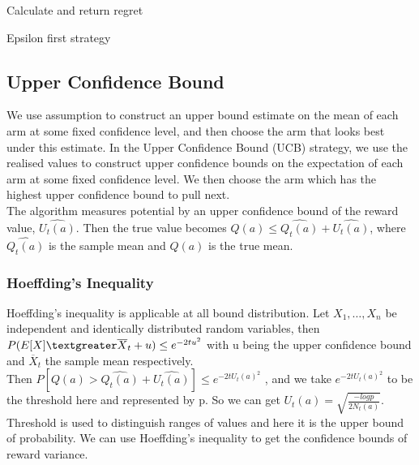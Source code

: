 {\begin{algorithm}[H]
    Calculate and return regret
    \caption{Epsilon first strategy}\label{alg:epsilon_algorithm}
\end{algorithm}

\subsection{Upper Confidence Bound}\label{subsec:upper-confidence-bound}
We use assumption to construct an upper bound estimate on the mean of each arm at some fixed confidence level, and then choose the arm that looks best under this estimate. \citep{SVGarbar2012} In the Upper Confidence Bound (UCB) strategy, we use the realised values to construct upper confidence bounds on the expectation of each arm at some fixed confidence level.
We then choose the arm which has the highest upper confidence bound to pull next.
\\The algorithm measures potential by an upper confidence bound of the reward value, $\widehat{U_t (a)}$.
Then the true value becomes $ Q(a)  \leq \widehat{Q_t (a)}+\widehat{U_t (a)} $, where  $ \widehat{Q_t (a)}$ is the sample mean and $ Q(a)$ is the true mean.

\subsubsection{Hoeffding’s Inequality}
Hoeffding's inequality is applicable at all bound distribution.
Let $X_1, \dots, X_n$ be independent and identically distributed random variables, then $ P(E[X]  \textgreater \overline  X_t + u) \leq e^{-2t u^2}$ with u being the upper confidence bound and $ \overline X_t $ the sample mean respectively. \citep{Hoeffding1963}
    \\Then $ P[Q(a) >\widehat{Q_t (a)}+\widehat{U_t (a)}] \leq e^{-2t U_t(a)^2}$ , and we take $e^{-2t U_t(a)^2} $ to be the threshold here and represented by p.
    So we can get $U_t(a) = \sqrt{\frac{-log p}{2N_t (a)}}$.
    Threshold is used to distinguish ranges of values and here it is the upper bound of probability.
    We can use Hoeffding's inequality to get the confidence bounds of reward variance.

}

